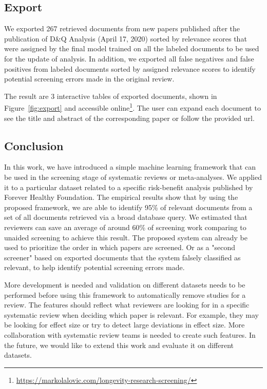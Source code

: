\documentclass[10pt,twocolumn,letterpaper]{article}
\begin{document}
\subsection{Export}
We exported 267 retrieved documents from new papers published after the publication of D\&Q Analysis (April 17, 2020) sorted by relevance scores that were assigned by the final model trained on all the labeled documents to be used for the update of analysis. In addition, we exported all false negatives and false positives from labeled documents sorted by assigned relevance scores to identify potential screening errors made in the original review. 

The result are 3 interactive tables of exported documents, shown in Figure~\ref{fig:export} and accessible online\footnote{\url{https://markolalovic.com/longevity-research-screening/}}. The user can expand each document to see the title and abstract of the corresponding paper or follow the provided url.

\subsection{Conclusion}
In this work, we have introduced a simple machine learning framework that can be used in the screening stage of systematic reviews or meta-analyses. We applied it to a particular dataset related to a specific risk-benefit analysis published by Forever Healthy Foundation. The empirical results show that by using the proposed framework, we are able to identify 95\% of relevant documents from a set of all documents retrieved via a broad database query. We estimated that reviewers can save an average of around 60\% of screening work comparing to unaided screening to achieve this result. The proposed system can already be used to prioritize the order in which papers are screened. Or as a "second screener" based on exported documents that the system falsely classified as relevant, to help identify potential screening errors made.

More development is needed and validation on different datasets needs to be performed before using this framework to automatically remove studies for a review. The features should reflect what reviewers are looking for in a specific systematic review when deciding which paper is relevant. For example, they may be looking for effect size or try to detect large deviations in effect size. More collaboration with systematic review teams is needed to create such features. In the future, we would like to extend this work and evaluate it on different datasets.



\end{document}
